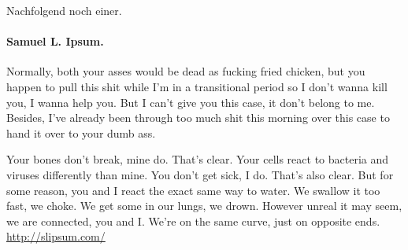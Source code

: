 \documentclass[12pt,        %
  english,ngerman,          %
  paper=a4,                 %
  captions=tablesignature,  %
  listof=numbered,          %
  bibliography=totoc,       %
  headings=small,           %
  headinclude=false,        %
  footinclude=false,        %
  parskip=half-,            %
  oneside,                  %
  DIV=12                    %
]{styles/coliartcl}
\begin{document}
Nachfolgend noch einer.

\paragraph*{Samuel L. Ipsum.}  Normally, both your asses would be dead as fucking fried chicken, but you happen to pull this shit while I'm in a transitional period so I don't wanna kill you, I wanna help you. But I can't give you this case, it don't belong to me. Besides, I've already been through too much shit this morning over this case to hand it over to your dumb ass.

Your bones don't break, mine do. That's clear. Your cells react to bacteria and viruses differently than mine. You don't get sick, I do. That's also clear. But for some reason, you and I react the exact same way to water. We swallow it too fast, we choke. We get some in our lungs, we drown. However unreal it may seem, we are connected, you and I. We're on the same curve, just on opposite ends.
\url{http://slipsum.com/}





\end{document}

